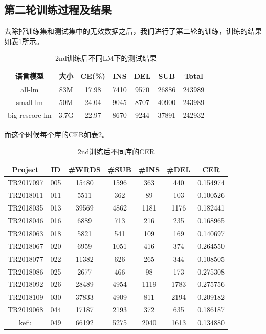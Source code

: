 \subsection{第二轮训练过程及结果}
去除掉训练集和测试集中的无效数据之后，我们进行了第二轮的训练，训练的结果如表\ref{tab:second-train}所示。
\begin{table}[h]
 \centering
 \caption{2nd训练后不同LM下的测试结果}
	 \begin{tabular*}{1\textwidth}{@{\extracolsep{\fill}}ccccccc}
	 \toprule
		{\bf 语言模型} & {\bf 大小} & {\bf CE(\%)} &{\bf INS} &{\bf DEL}  &{\bf SUB} &{\bf Total}\\
	 \midrule
	   all-lm         &  83M   & 17.98   &  7410  &  9570  & 26886  & 243989 \\
	   small-lm       &  50M   & 24.04   &  9045  &   8707 & 40900  & 243989 \\
	   big-rescore-lm &  3.7G  & 22.97   &  8670  &   9244 & 37891  & 242932 \\
	 \bottomrule
	 \end{tabular*}%
 \label{tab:second-train}%
\end{table}%

而这个时候每个库的CER如表\ref{tab:second-each}。
\begin{table}[h]
 \centering
 \caption{2nd训练后不同库的CER}
	 \begin{tabular*}{1\textwidth}{@{\extracolsep{\fill}}ccccccc}
	 \toprule
		{\bf Project   } & {\bf ID   } & {\bf #WRDS   } & {\bf #SUB    } & {\bf #INS    } & {\bf #DEL    } & {\bf CER  } \\
	 \midrule
		TR2017097 &	005  &	15480   &	1596  &  	363    & 	440   &  	0.154974 \\
		TR2018011 &	011  &	5511    &	362   &  	89     & 	103   &  	0.100526 \\
		TR2018035 &	013  &	39569   &	4862  &  	1181   & 	1176  &  	0.182441 \\
		TR2018046 &	016  &	6889    &	713   &  	216    & 	235   &  	0.168965 \\
		TR2018063 &	018  &	5821    &	541   &  	109    & 	169   &  	0.140697 \\
		TR2018067 &	020  &	6959    &	1051  &  	416    & 	374   &  	0.264550 \\
		TR2018077 &	022  &	11382   &	626   &  	265    & 	344   &  	0.108505 \\
		TR2018086 &	025  &	2677    &	466   &  	98     & 	173   &  	0.275308 \\
		TR2018092 &	026  &	28489   &	4954  &  	1119   & 	1783  &  	0.275756 \\
		TR2018109 &	030  &	37833   &	4909  &  	811    & 	2194  &  	0.209182 \\
		TR2019068 &	044  &	17187   &	2193  &  	372    & 	635   &  	0.186187 \\
		kefu      &	049  &	66192   &	5275  &  	2040   & 	1613  &  	0.134880 \\
	 \bottomrule
	 \end{tabular*}%
 \label{tab:second-each}%
\end{table}%

